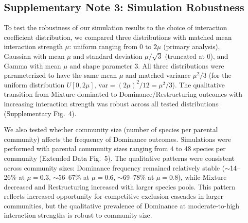 \subsection*{Supplementary Note 3: Simulation Robustness}
\label{sec:suppl:note3}

To test the robustness of our simulation results to the choice of interaction coefficient distribution, we compared three distributions with matched mean interaction strength $\mu$: uniform ranging from 0 to $2\mu$ (primary analysis), Gaussian with mean $\mu$ and standard deviation $\mu/\sqrt{3}$ (truncated at 0), and Gamma with mean $\mu$ and shape parameter 3. All three distributions were parameterized to have the same mean $\mu$ and matched variance $\mu^2/3$ (for the uniform distribution $U[0, 2\mu]$, $\text{var} = (2\mu)^2/12 = \mu^2/3$). The qualitative transition from Mixture-dominated to Dominance/Restructuring outcomes with increasing interaction strength was robust across all tested distributions (Supplementary Fig.~4).

We also tested whether community size (number of species per parental community) affects the frequency of Dominance outcomes. Simulations were performed with parental community sizes ranging from 4 to 48 species per community (Extended Data Fig.~5). The qualitative patterns were consistent across community sizes: Dominance frequency remained relatively stable ($\sim$14--26\% at $\mu=0.3$, $\sim$56--67\% at $\mu=0.6$, $\sim$69--78\% at $\mu=0.8$), while Mixture decreased and Restructuring increased with larger species pools. This pattern reflects increased opportunity for competitive exclusion cascades in larger communities, but the qualitative prevalence of Dominance at moderate-to-high interaction strengths is robust to community size.

